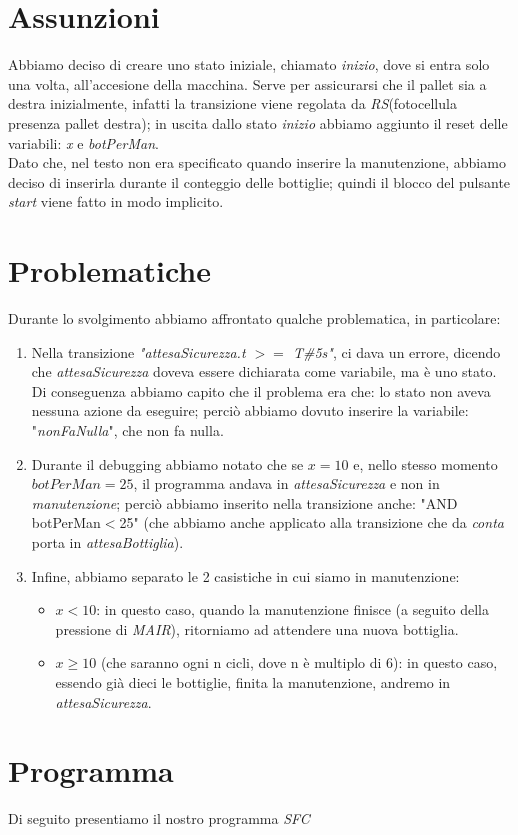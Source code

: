 \documentclass{article}
\begin{document}
\section{Assunzioni}
Abbiamo deciso di creare uno stato iniziale, chiamato \textit{inizio}, dove si entra solo una volta, all'accesione della macchina. Serve per assicurarsi che il pallet sia a destra inizialmente, infatti la transizione viene regolata da \textit{RS}(fotocellula presenza pallet destra); in uscita dallo stato \textit{inizio} abbiamo aggiunto il reset delle variabili: \textit{x} e \textit{botPerMan}.  
\\

Dato che, nel testo non era specificato quando inserire la manutenzione, abbiamo deciso di inserirla durante il conteggio delle bottiglie; quindi il blocco del pulsante \textit{start} viene fatto in modo implicito.


\section{Problematiche}
Durante lo svolgimento abbiamo affrontato qualche problematica, in particolare:
\begin{enumerate}
    \item Nella transizione \textit{"attesaSicurezza.t $>=$ T\#5s"}, ci dava un errore, dicendo che \textit{attesaSicurezza} doveva essere dichiarata come variabile, ma è uno stato. Di conseguenza abbiamo capito che il problema era che: lo stato non aveva nessuna azione da eseguire; perciò abbiamo dovuto inserire la variabile: "\textit{nonFaNulla}", che non fa nulla.
    \item Durante il debugging abbiamo notato che se $x = 10$ e, nello stesso momento $botPerMan = 25$, il programma andava in \textit{attesaSicurezza} e non in \textit{manutenzione}; perciò abbiamo inserito nella transizione anche: "AND botPerMan$<$25" (che abbiamo anche applicato alla transizione che da \textit{conta} porta in \textit{attesaBottiglia}).
    \item Infine, abbiamo separato le 2 casistiche in cui siamo in manutenzione:
          \begin{itemize}
              \item $x < 10$: in questo caso, quando la manutenzione finisce (a seguito della pressione di \textit{MAIR}), ritorniamo ad attendere una nuova bottiglia.
              \item $x \geq 10$ (che saranno ogni n cicli, dove n è multiplo di 6):  in questo caso, essendo già dieci le bottiglie, finita la manutenzione, andremo in \textit{attesaSicurezza}.
          \end{itemize}
\end{enumerate}

\section{Programma}
Di seguito presentiamo il nostro programma \textit{SFC}

\end{document}
